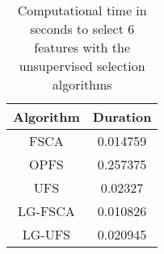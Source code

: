 \begin{table}
	\begin{center}
		\begin{tabular}{c c}
			Algorithm & Duration \\
			\hline
			FSCA & 0.014759 \\
			OPFS & 0.257375 \\
			UFS & 0.02327 \\
			LG-FSCA & 0.010826 \\
			LG-UFS & 0.020945 \\
		\end{tabular}
	\end{center}
	\caption{Computational time in seconds to select 6 features with the unsupervised selection algorithms}
\end{table}